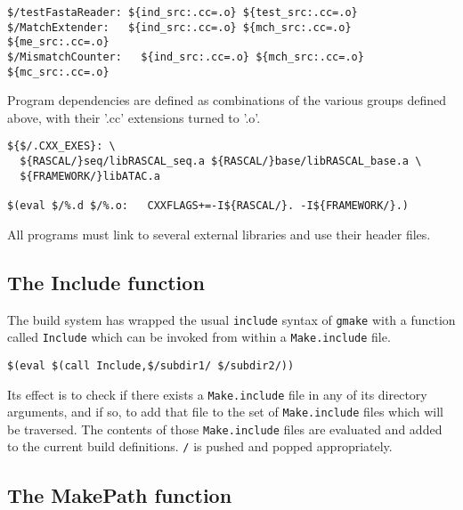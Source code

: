 \documentclass[letterpaper]{article}
\begin{document}
\begin{verbatim}
$/testFastaReader: ${ind_src:.cc=.o} ${test_src:.cc=.o}
$/MatchExtender:   ${ind_src:.cc=.o} ${mch_src:.cc=.o} ${me_src:.cc=.o} 
$/MismatchCounter:   ${ind_src:.cc=.o} ${mch_src:.cc=.o} ${mc_src:.cc=.o} 
\end{verbatim}
Program dependencies are defined as combinations of the various
groups defined above, with their '.cc' extensions turned to '.o'.

\begin{verbatim}
${$/.CXX_EXES}: \
  ${RASCAL/}seq/libRASCAL_seq.a ${RASCAL/}base/libRASCAL_base.a \
  ${FRAMEWORK/}libATAC.a

$(eval $/%.d $/%.o:   CXXFLAGS+=-I${RASCAL/}. -I${FRAMEWORK/}.)
\end{verbatim}
All programs must link to several external libraries and use their
header files.

\subsection{The Include function}

The build system has wrapped the usual \verb+include+ syntax of
\verb+gmake+ with a function called \verb+Include+ which can be
invoked from within a \verb+Make.include+ file.
\begin{verbatim}
$(eval $(call Include,$/subdir1/ $/subdir2/))
\end{verbatim}
Its effect is to check if there exists a \verb+Make.include+ file
in any of its directory arguments, and if so, to add that file to
the set of \verb+Make.include+ files which will be traversed.
The contents of those \verb+Make.include+ files are evaluated
and added to the current build definitions.  \verb+/+ is pushed
and popped appropriately.

\subsection{The MakePath function}
\end{document}
